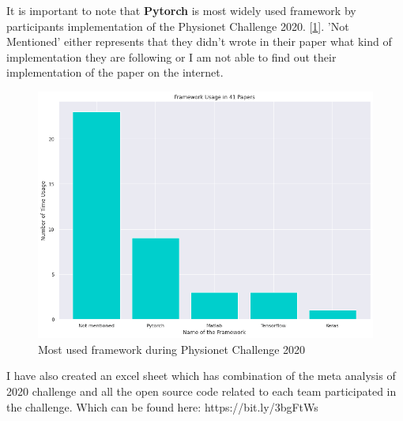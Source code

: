 It is important to note that \textbf{Pytorch} is most widely used framework by participants implementation of the Physionet Challenge 2020. [\ref{fig:framework_used_by_2020_teams}]. 'Not Mentioned' either represents that they didn't wrote in their paper what kind of implementation they are following or I am not able to find out their implementation of the paper on the internet. 

\begin{figure}[H]
\centering
\includegraphics[scale=0.5]{img/framework_usage_in_papers.png}
\caption{Most used framework during Physionet Challenge 2020}
\label{fig:framework_used_by_2020_teams}
\end{figure}

I have also created an excel sheet which has combination of the meta analysis of 2020 challenge \cite{main_arythmia_detection} and all the open source code related to each team participated in the challenge. Which can be found here: https://bit.ly/3bgFtWs 

